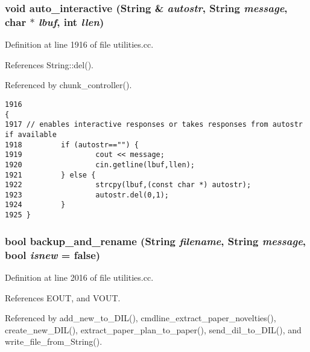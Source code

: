 \subsubsection{\setlength{\rightskip}{0pt plus 5cm}void auto\_\-interactive ({\bf String} \& {\em autostr}, {\bf String} {\em message}, char $\ast$ {\em lbuf}, int {\em llen})}\label{utilities_8cc_a29}




Definition at line 1916 of file utilities.cc.

References String::del().

Referenced by chunk\_\-controller().



\footnotesize\begin{verbatim}1916                                                                                {
1917 // enables interactive responses or takes responses from autostr if available
1918         if (autostr=="") {
1919                 cout << message;
1920                 cin.getline(lbuf,llen);
1921         } else {
1922                 strcpy(lbuf,(const char *) autostr);
1923                 autostr.del(0,1);
1924         }
1925 }
\end{verbatim}\normalsize 
{}
\subsubsection{\setlength{\rightskip}{0pt plus 5cm}bool backup\_\-and\_\-rename ({\bf String} {\em filename}, {\bf String} {\em message}, bool {\em isnew} = {\bf false})}\label{utilities_8cc_a36}




Definition at line 2016 of file utilities.cc.

References EOUT, and VOUT.

Referenced by add\_\-new\_\-to\_\-DIL(), cmdline\_\-extract\_\-paper\_\-novelties(), create\_\-new\_\-DIL(), extract\_\-paper\_\-plan\_\-to\_\-paper(), send\_\-dil\_\-to\_\-DIL(), and write\_\-file\_\-from\_\-String().



